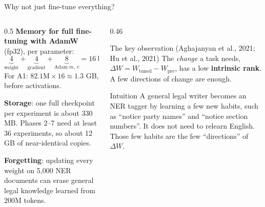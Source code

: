 \documentclass[aspectratio=169,11pt]{beamer}
\begin{document}
\begin{frame}{Why not just fine-tune everything?}
  \begin{columns}[T]
    \begin{column}{0.5\textwidth}
      \small
      \textbf{Memory for full fine-tuning with AdamW} (fp32), per parameter:
      \[
        \underbrace{4}_{\text{weight}}+\underbrace{4}_{\text{gradient}}+\underbrace{8}_{\text{Adam } m,\,v}=16\ \text{bytes}
      \]
      For A1: $82.1\text{M}\times16 \approx 1.3$ GB, before activations.
      \vspace{2mm}

      \textbf{Storage}: one full checkpoint per experiment is about 330 MB. Phases 2--7 need at least 36 experiments, so about 12 GB of near-identical copies.
      \vspace{2mm}

      \textbf{Forgetting}: updating every weight on 5,000 NER documents can erase general legal knowledge learned from 200M tokens.
    \end{column}
    \begin{column}{0.46\textwidth}
      \begin{block}{The key observation (Aghajanyan et al., 2021; Hu et al., 2021)}
        \small
        The \emph{change} a task needs, $\Delta W = W_{\text{tuned}}-W_{\text{pre}}$, has a low \textbf{intrinsic rank}.
        A few directions of change are enough.
      \end{block}
      \begin{exampleblock}{Intuition}
        \small
        A general legal writer becomes an NER tagger by learning a few new habits, such as ``notice party names'' and ``notice section numbers''. It does not need to relearn English.
        Those few habits are the few ``directions'' of $\Delta W$.
      \end{exampleblock}
    \end{column}
  \end{columns}
\end{frame}
\end{document}

